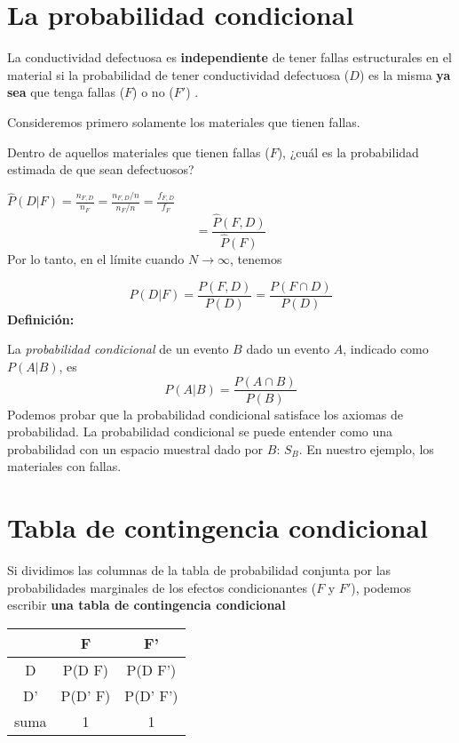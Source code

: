 \documentclass[
]{book}
\begin{document}
\hypertarget{la-probabilidad-condicional}{%
\section{La probabilidad condicional}\label{la-probabilidad-condicional}}

La conductividad defectuosa es \textbf{independiente} de tener fallas estructurales en el material si la probabilidad de tener conductividad defectuosa (\(D\)) es la misma \textbf{ya sea} que tenga fallas (\(F\)) o no (\(F'\)) .

Consideremos primero solamente los materiales que tienen fallas.

Dentro de aquellos materiales que tienen fallas (\(F\)), ¿cuál es la probabilidad estimada de que sean defectuosos?

\(\hat{P}(D|F)=\frac{n_{F,D}}{n_{F}}=\frac{n_{F,D}/n}{n_{F}/n}= \frac{f_{F,D}}{f_{F}}\)
\[= \frac{\hat{P}(F,D)}{\hat{P}(F)}\]
Por lo tanto, en el límite cuando \(N \rightarrow \infty\), tenemos

\[P(D|F)=\frac{P(F, D)}{P(D)}=\frac{P(F \cap D)}{P(D)}\]
\textbf{Definición:}

La \emph{probabilidad condicional} de un evento \(B\) dado un evento \(A\), indicado como \(P(A|B)\), es
\[P(A|B) = \frac{P(A\cap B)}{P(B)}\]
Podemos probar que la probabilidad condicional satisface los axiomas de probabilidad. La probabilidad condicional se puede entender como una probabilidad con un espacio muestral dado por \(B\): \(S_B\). En nuestro ejemplo, los materiales con fallas.

\hypertarget{tabla-de-contingencia-condicional}{%
\section{Tabla de contingencia condicional}\label{tabla-de-contingencia-condicional}}

Si dividimos las columnas de la tabla de probabilidad conjunta por las probabilidades marginales de los efectos condicionantes (\(F\) y \(F'\)), podemos escribir \textbf{una tabla de contingencia condicional}

\begin{longtable}[]{@{}ccc@{}}
\toprule
& F & F' \\
\midrule
\endhead
D & P(D {\textbar{}} F) & P(D {\textbar{}} F') \\
D' & P(D' {\textbar{}} F) & P(D' {\textbar{}} F') \\
suma & 1 & 1 \\
\bottomrule
\end{longtable}
\end{document}
